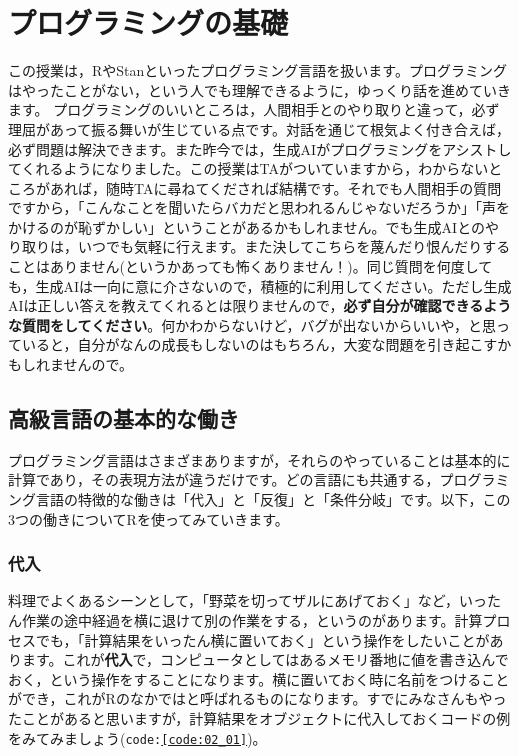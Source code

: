 \documentclass{ltjsbook}
\begin{document}
\chapter{プログラミングの基礎}
\label{x17_Programming2}
この授業は，RやStanといったプログラミング言語を扱います。プログラミングはやったことがない，という人でも理解できるように，ゆっくり話を進めていきます。
プログラミングのいいところは，人間相手とのやり取りと違って，必ず理屈があって振る舞いが生じている点です。対話を通じて根気よく付き合えば，必ず問題は解決できます。また昨今では，生成AIがプログラミングをアシストしてくれるようになりました。この授業はTAがついていますから，わからないところがあれば，随時TAに尋ねてくだされば結構です。それでも人間相手の質問ですから，「こんなことを聞いたらバカだと思われるんじゃないだろうか」「声をかけるのが恥ずかしい」ということがあるかもしれません。でも生成AIとのやり取りは，いつでも気軽に行えます。また決してこちらを蔑んだり恨んだりすることはありません(というかあっても怖くありません！)。同じ質問を何度しても，生成AIは一向に意に介さないので，積極的に利用してください。ただし生成AIは正しい答えを教えてくれるとは限りませんので，\textbf{必ず自分が確認できるような質問をしてください}。何かわからないけど，バグが出ないからいいや，と思っていると，自分がなんの成長もしないのはもちろん，大変な問題を引き起こすかもしれませんので。


\section{高級言語の基本的な働き}
プログラミング言語はさまざまありますが，それらのやっていることは基本的に計算であり，その表現方法が違うだけです。どの言語にも共通する，プログラミング言語の特徴的な働きは「代入」と「反復」と「条件分岐」です。以下，この3つの働きについてRを使ってみていきます。
\subsection{代入}
料理でよくあるシーンとして，「野菜を切ってザルにあげておく」など，いったん作業の途中経過を横に退けて別の作業をする，というのがあります。計算プロセスでも，「計算結果をいったん横に置いておく」という操作をしたいことがあります。これが\textbf{代入}で，コンピュータとしてはあるメモリ番地に値を書き込んでおく，という操作をすることになります。横に置いておく時に名前をつけることができ，これがRのなかではと呼ばれるものになります。すでにみなさんもやったことがあると思いますが，計算結果をオブジェクトに代入しておくコードの例をみてみましょう(\texttt{code:\ref{code:02_01}})。
\end{document}
